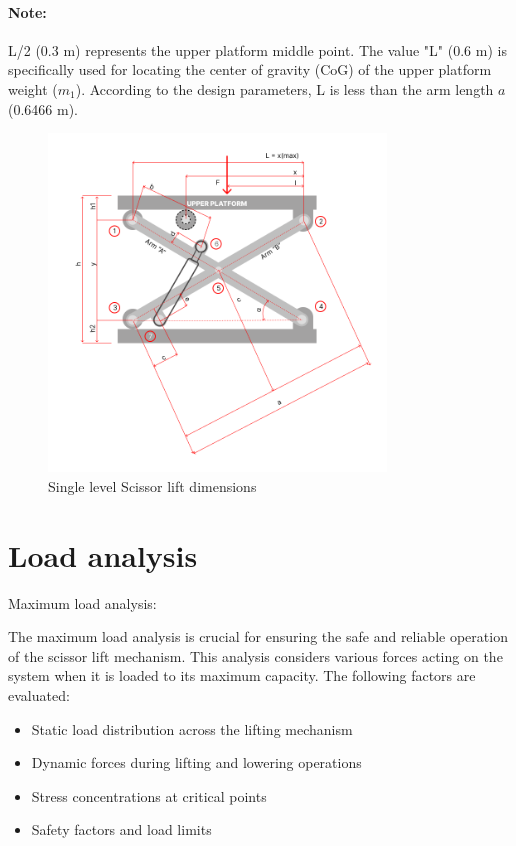 \documentclass[../../main]{subfiles}
\begin{document}
  \paragraph{Note:} 
  L/2 (0.3 m) represents the upper platform middle point. The
  value "L" (0.6 m) is specifically used for locating the center of
  gravity (CoG) of the upper platform weight ($m_1$). According to the
  design parameters, L is less than the arm length $a$ (0.6466 m).

\begin{figure}[h]
\centering
\includegraphics[width=0.8\textwidth]{img/image005.png}
\caption{Single level Scissor lift dimensions}
\end{figure}
\newpage
\section{Load analysis}\label{load-analysis}

Maximum load analysis:

The maximum load analysis is crucial for ensuring the safe and reliable
operation of the scissor lift mechanism. This analysis considers various
forces acting on the system when it is loaded to its maximum capacity.
The following factors are evaluated:

\begin{itemize}
\item
  Static load distribution across the lifting mechanism
\item
  Dynamic forces during lifting and lowering operations
\item
  Stress concentrations at critical points
\item
  Safety factors and load limits
\end{itemize}
\end{document}
